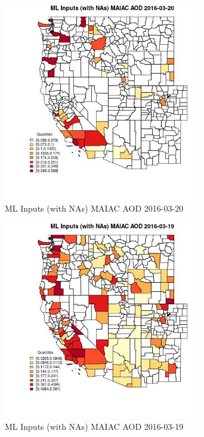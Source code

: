 \begin{figure} 
\centering  
\includegraphics[width=0.77\textwidth]{Code_Outputs/Report_ML_input_PM25_Step4_part_e_de_duplicated_aveswNAs_CountyMAIAC_AODMean2016-03-20_2016-03-20.jpg} 
\caption{\label{fig:Report_ML_input_PM25_Step4_part_e_de_duplicated_aveswNAsCountyMAIAC_AODMean2016-03-20_2016-03-20}ML Inputs (with NAs) MAIAC AOD 2016-03-20} 
\end{figure} 
 

\begin{figure} 
\centering  
\includegraphics[width=0.77\textwidth]{Code_Outputs/Report_ML_input_PM25_Step4_part_e_de_duplicated_aveswNAs_CountyMAIAC_AODMean2016-03-19_2016-03-19.jpg} 
\caption{\label{fig:Report_ML_input_PM25_Step4_part_e_de_duplicated_aveswNAsCountyMAIAC_AODMean2016-03-19_2016-03-19}ML Inputs (with NAs) MAIAC AOD 2016-03-19} 
\end{figure} 
 

